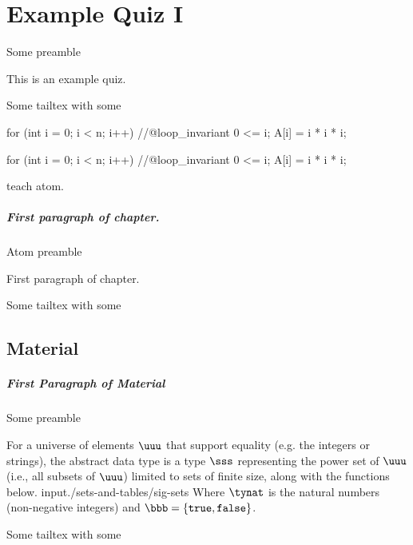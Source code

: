 \chapter[100]{Example Quiz I}
\label{ch:quiz-ii}

Some preamble \somecommand

\begin{preamble}
This is an example quiz.
\end{preamble}
Some tailtex with some \command

\begin{code}
  for (int i = 0; i < n; i++)  
  //@loop_invariant 0 <= i;  
  {  
    A[i] = i * i * i;  
  }  
\end{code}

\begin{code}[language=c, firstline = 100, lastline = 1000]
  for (int i = 0; i < n; i++)  
  //@loop_invariant 0 <= i;  
  {  
    A[i] = i * i * i;  
  }  
\end{code}

\begin{teachask}
teach atom.
\end{teachask}

\paragraph{First paragraph of chapter.}

Atom preamble
\begin{gram}
First paragraph of chapter.
\end{gram}
Some tailtex with some \command
\newpage

\section{Material}

\paragraph{First Paragraph of Material}

Some preamble \somecommand
\begin{cluster}
\begin{datatype}[Sets]
\label{XXadt:sets} 
For a universe of elements $\uuu$ that support equality (e.g. the integers or strings), the 
 abstract data type is a type $\sss$ representing the power 
set of $\uuu$ (i.e., all subsets of $\uuu$) limited to sets of finite 
size, along with the functions below. 
{\normalsize
input{./sets-and-tables/sig-sets}
}
Where $\tynat$ is 
the natural numbers (non-negative integers) and $\bbb = \{\texttt{true},
\texttt{false}\}$.
\end{datatype}
Some tailtex with some \command
\end{cluster}

